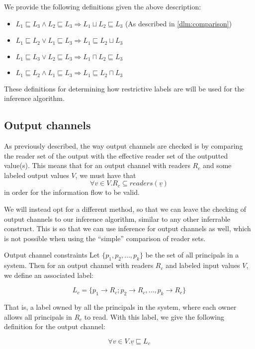 We provide the following definitions given the above description:
\begin{itemize}
  \item $L_1 \sqsubseteq L_3 \wedge L_2 \sqsubseteq L_3 \Rightarrow L_1 \sqcup L_2 \sqsubseteq L_3$ (As described in \cref{dlm:comparison})
  \item $L_1 \sqsubseteq L_2 \vee L_1 \sqsubseteq L_3 \Rightarrow L_1 \sqsubseteq L_2 \sqcup L_3$
  \item $L_1 \sqsubseteq L_3 \vee L_2 \sqsubseteq L_3 \Rightarrow L_1 \sqcap L_2 \sqsubseteq L_3$
  \item $L_1 \sqsubseteq L_2 \wedge L_1 \sqsubseteq L_3 \Rightarrow L_1 \sqsubseteq L_2 \sqcap L_3$
\end{itemize}

These definitions for determining how restrictive labels are will be used for the inference algorithm.

\subsection{Output channels}
As previously described, the way output channels are checked is by comparing the reader set of the output with the effective reader set of the outputted value(s).
This means that for an output channel with readers $R_c$ and some labeled output values $V$, we must have that
\[ \forall v \in V.R_c \subseteq readers(\underline{v}) \]
in order for the information flow to be valid.

We will instead opt for a different method, so that we can leave the checking of output channels to our inference algorithm, similar to any other inferrable construct.
This is so that we can use inference for output channels as well, which is not possible when using the ``simple'' comparison of reader sets.

\begin{definition}{Output channel constraints}\label{dlm:def:outputconstraints}
Let $ \{p_1, p_2, \dots, p_k\} $ be the set of all principals in a system.
Then for an output channel with readers $R_c$ and labeled input values $V$, we define an associated label:

\[ L_c = \{ p_1 \rightarrow R_c; p_2 \rightarrow R_c, \dots, p_k \rightarrow R_c \} \]

That is, a label owned by all the principals in the system, where each owner allows all principals in $R_c$ to read.
With this label, we give the following definition for the output channel:

\[ \forall v \in V.\underline{v} \sqsubseteq L_c \]
\end{definition}

